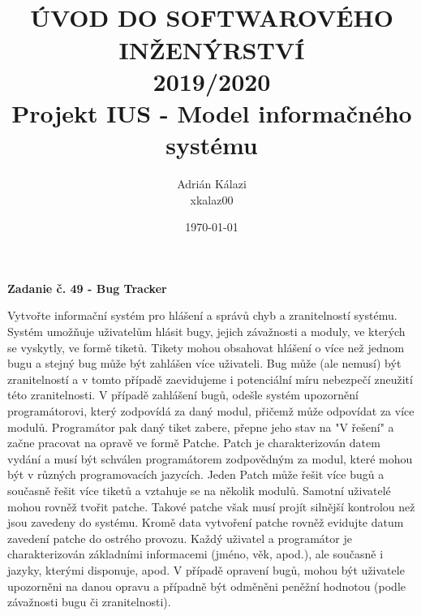 \documentclass[]{fitiel} %
\title{\logo\vspace{2cm}\\\huge{ÚVOD DO SOFTWAROVÉHO INŽENÝRSTVÍ\\2019/2020}\\\vspace{2cm}Projekt IUS - Model informačného systému}
\author{Adrián Kálazi \\ xkalaz00}
\date{\today} %
\begin{document}
	
	\maketitle
	
	\begin{center}
		\textbf{\Large{Zadanie č. 49 - Bug Tracker}}
	\end{center}

	Vytvořte informační systém pro hlášení a správů chyb a zranitelností systému. Systém umožňuje uživatelům hlásit bugy, jejich závažnosti a moduly, ve kterých se vyskytly, ve formě tiketů. Tikety mohou obsahovat hlášení o více než jednom bugu a stejný bug může být zahlášen více uživateli. Bug může (ale nemusí) být zranitelností a v tomto případě zaevidujeme i potenciální míru nebezpečí zneužití této zranitelnosti. V případě zahlášení bugů, odešle systém upozornění programátorovi, který zodpovídá za daný modul, přičemž může odpovídat za více modulů. Programátor pak daný tiket zabere, přepne jeho stav na "V řešení" a začne pracovat na opravě ve formě Patche. Patch je charakterizován datem vydání a musí být schválen programátorem zodpovědným za modul, které mohou být v různých programovacích jazycích. Jeden Patch může řešit více bugů a současně řešit více tiketů a vztahuje se na několik modulů. Samotní uživatelé mohou rovněž tvořit patche. Takové patche však musí projít silnější kontrolou než jsou zavedeny do systému. Kromě data vytvoření patche rovněž evidujte datum zavedení patche do ostrého provozu. Každý uživatel a programátor je charakterizován základními informacemi (jméno, věk, apod.), ale současně i jazyky, kterými disponuje, apod. V případě opravení bugů, mohou být uživatele upozorněni na danou opravu a případně být odměněni peněžní hodnotou (podle závažnosti bugu či zranitelnosti). 
	
	\begin{center}
		
		
		
	\end{center}
	

%	

	
	
\end{document}
